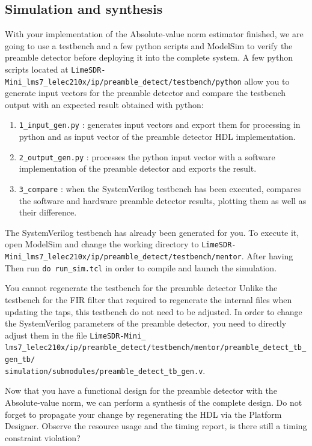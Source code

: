 \subsection{Simulation and synthesis}
\begin{sloppypar}
With your implementation of the Absolute-value norm estimator finished, we are going to use a testbench and a few python scripts and ModelSim to verify the preamble detector before deploying it into the complete system. A few python scripts located at \texttt{LimeSDR-Mini\_lms7\_lelec210x/ip/preamble\_detect/testbench/python} allow you to generate input vectors for the preamble detector and compare the testbench output with an expected result obtained with python:

\begin{enumerate}
    \item \texttt{1\_input\_gen.py} : generates input vectors and export them for processing in python and as input vector of the preamble detector HDL implementation.
    \item \texttt{2\_output\_gen.py} : processes the python input vector with a software implementation of the preamble detector and exports the result.
    \item \texttt{3\_compare} : when the SystemVerilog testbench has been executed, compares the software and hardware preamble detector results, plotting them as well as their difference.
\end{enumerate}

The SystemVerilog testbench has already been generated for you. To execute it, open ModelSim and change the working directory to \texttt{LimeSDR-Mini\_lms7\_lelec210x/ip/preamble\_detect/testbench/mentor}. After having Then run \texttt{do run\_sim.tcl} in order to compile and launch the simulation.



\end{sloppypar}
\begin{bclogo}[couleur = gray!20, arrondi = 0.2, logo=\bcattention]{You cannot regenerate the testbench for the preamble detector}
    Unlike the testbench for the FIR filter that required to regenerate the internal files when updating the taps, this testbench do not need to be adjusted. In order to change the SystemVerilog parameters of the preamble detector, you need to directly adjust them in the file \texttt{LimeSDR-Mini\_}\\\texttt{lms7\_lelec210x/ip/preamble\_detect/testbench/mentor/preamble\_detect\_tb\_gen\_tb/}\\\texttt{simulation/submodules/preamble\_detect\_tb\_gen.v}.
\end{bclogo}

Now that you have a functional design for the preamble detector with the Absolute-value norm, we can perform a synthesis of the complete design. Do not forget to propagate your change by regenerating the HDL via the Platform Designer. Observe the resource usage and the timing report, is there still a timing constraint violation?

